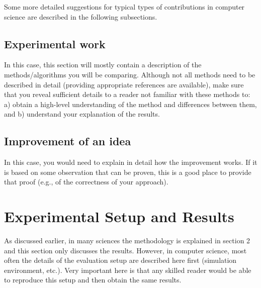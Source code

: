 \documentclass[english]{article}
\begin{document}
Some more detailed suggestions for typical types of contributions in computer science are described in the following subsections.

\subsection*{Experimental work}
In this case, this section will mostly contain a description of the methods/algorithms you will be comparing. Although not all methods need to be described in detail (providing appropriate references are available), make sure that you reveal sufficient details to a reader not familiar with these methods to: a) obtain a high-level understanding of the method and differences between them, and b) understand your explanation of the results.

\subsection*{Improvement of an idea}
In this case, you would need to explain in detail how the improvement works. If it is based on some observation that can be proven, this is a good place to provide that proof (e.g., of the correctness of your approach). 

%

\section{Experimental Setup and Results}
As discussed earlier, in many sciences the methodology is explained in section 2 and this section only discusses the results. 
However, in computer science, most often the details of the evaluation setup are described here first (simulation environment, etc.).
Very important here is that any skilled reader would be able to reproduce this setup and then obtain the same results.
\end{document}
